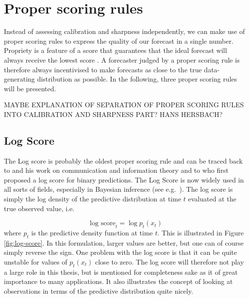 \documentclass[
]{book}
\begin{document}
\hypertarget{proper-scoring-rules}{%
\section{Proper scoring rules}\label{proper-scoring-rules}}

Instead of assessing calibration and sharpness independently, we can make use of proper scoring rules to express the quality of our forecast in a single number. Propriety is a feature of a score that guarantees that the ideal forecast will always receive the lowest score \citep{gneitingStrictlyProperScoring2007}. A forecaster judged by a proper scoring rule is therefore always incentivised to make forecasts as close to the true data-generating distribution as possible. In the following, three proper scoring rules will be presented.

MAYBE EXPLANATION OF SEPARATION OF PROPER SCORING RULES INTO CALIBRATION AND SHARPNESS PART? HANS HERSBACH?

\hypertarget{log-score}{%
\subsection{Log Score}\label{log-score}}

The Log score is probably the oldest proper scoring rule and can be traced back to \citet{shannonMathematicalTheoryCommunication1948} and his work on communication and information theory and to \citet{goodRationalDecisions1952} who first proposed a log score for binary predictions. The Log Score is now widely used in all sorts of fields, especially in Bayesian inference (see e.g.~\citep{gelmanUnderstandingPredictiveInformation2014}). The log score is simply the log density of the predictive distribution at time \(t\) evaluated at the true observed value, i.e.~

\[ \text{log score}_t = \log p_t(x_t)\]
where \(p_t\) is the predictive density function at time \(t\). This is illustrated in Figure \ref{fig:log-score}. In this formulation, larger values are better, but one can of course simply reverse the sign. One problem with the log score is that it can be quite unstable for values of \(p_t(x_t)\) close to zero. The log score will therefore not play a large role in this thesis, but is mentioned for completeness sake as it of great importance to many applications. It also illustrates the concept of looking at observations in terms of the predictive distribution quite nicely.
\end{document}
